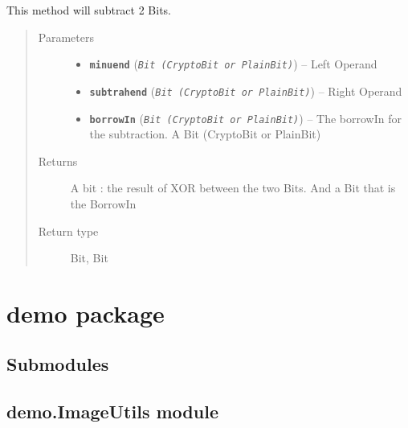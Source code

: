 \documentclass[letterpaper,10pt,english]{sphinxmanual}
\begin{document}
\begin{fulllineitems}
\label{datatypes.integers:datatypes.integers.Utility.completeSubOnOneBit}
This method will subtract 2 Bits.
\begin{quote}\begin{description}
\item[{Parameters}] \leavevmode\begin{itemize}
\item {} 
\textbf{\texttt{minuend}} (\emph{\texttt{Bit (CryptoBit or PlainBit)}}) -- Left Operand

\item {} 
\textbf{\texttt{subtrahend}} (\emph{\texttt{Bit (CryptoBit or PlainBit)}}) -- Right Operand

\item {} 
\textbf{\texttt{borrowIn}} (\emph{\texttt{Bit (CryptoBit or PlainBit)}}) -- The borrowIn for the subtraction. A Bit (CryptoBit or PlainBit)

\end{itemize}

\item[{Returns}] \leavevmode
A bit : the result of XOR between the two Bits. And a Bit that is the BorrowIn

\item[{Return type}] \leavevmode
Bit, Bit

\end{description}\end{quote}

\end{fulllineitems}



\section{demo package}
\label{demo::doc}\label{demo:demo-package}

\subsection{Submodules}
\label{demo:submodules}

\subsection{demo.ImageUtils module}
\label{demo:module-demo.ImageUtils}\label{demo:demo-imageutils-module}
\end{document}

